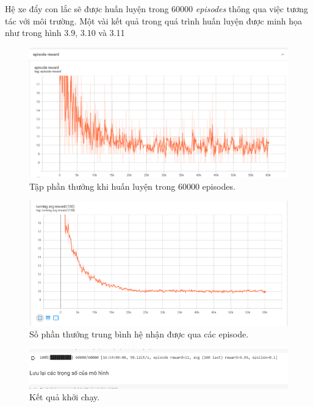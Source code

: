 \documentclass[12pt,a4paper]{report}
\begin{document}
\noindent Hệ xe đẩy con lắc sẽ được huấn luyện trong 60000 \textit{episodes} thông qua việc tương tác với
môi trường. Một vài kết quả trong quá trình huấn luyện được minh họa như trong hình 3.9, 3.10 và 3.11
\begin{figure}[h]
	\centering
	\includegraphics[scale=.3]{16}
	\caption{Tập phần thưởng khi  huấn luyện trong 60000 episodes.}
\end{figure}
\begin{figure}[h]
	\centering
	\includegraphics[scale=.75]{17}
	\caption{Số phần thưởng trung bình hệ nhận được qua các episode.}
\end{figure}
\begin{figure}[h]
	\centering
	\includegraphics[scale=.75]{18}
	\caption{Kết quả khởi chạy.}
\end{figure}
\end{document}
